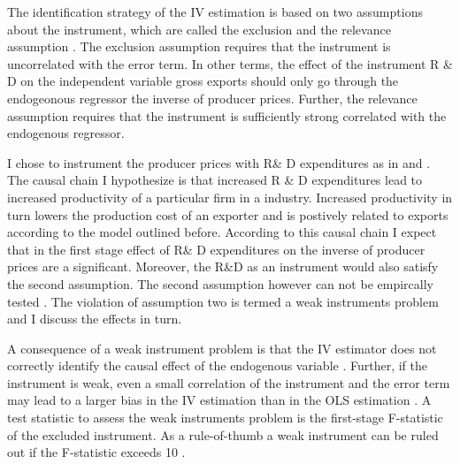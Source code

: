  \par
The identification strategy of the IV estimation is based on two assumptions about the instrument, which are called the exclusion and the relevance assumption \parencite{cameron2009}.
The exclusion assumption requires that the instrument is uncorrelated with the error term.
In other terms, the effect of the instrument R \& D on the independent variable gross exports should only go through the endogeonous regressor the inverse of producer prices.
 Further, the relevance assumption requires that  the instrument is sufficiently strong correlated with the endogenous regressor.
 \par%
 I chose to instrument the producer prices with R\& D expenditures as in \textcite{costinot} and \textcite{eaton}. The causal chain I hypothesize is that increased R \& D expenditures lead to increased productivity of a particular firm in a industry.
 Increased productivity in turn lowers the production cost of an exporter and is postively related to exports according to the model outlined before.
 According to this causal chain I expect that in the first stage effect of R\& D expenditures on the inverse of producer prices are a significant.
 Moreover, the R\&D as an instrument would also satisfy the second assumption.
 The second assumption however can not be empircally tested \parencite[p.85]{greene}.
The violation of assumption two is termed a weak instruments problem and I discuss the effects in turn. \par
A consequence of a weak instrument problem is that the IV estimator does not correctly identify the causal effect of the endogenous variable  \parencite{bound}.
Further, if the instrument is weak, even a small correlation of the instrument and the error term may lead to a larger  bias in the IV estimation than in the OLS estimation \parencite{bound}. A test statistic to assess the weak instruments problem is the first-stage F-statistic of the excluded instrument. As a rule-of-thumb a weak instrument can be ruled out if the F-statistic exceeds 10 \parencite{mastering}.    \par

